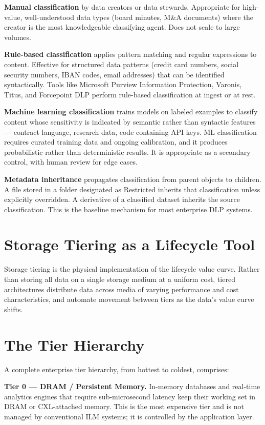 \textbf{Manual classification} by data creators or data stewards. Appropriate for high-value, well-understood data types (board minutes, M\&A documents) where the creator is the most knowledgeable classifying agent. Does not scale to large volumes.

\textbf{Rule-based classification} applies pattern matching and regular expressions to content. Effective for structured data patterns (credit card numbers, social security numbers, IBAN codes, email addresses) that can be identified syntactically. Tools like Microsoft Purview Information Protection, Varonis, Titus, and Forcepoint DLP perform rule-based classification at ingest or at rest.

\textbf{Machine learning classification} trains models on labeled examples to classify content whose sensitivity is indicated by semantic rather than syntactic features --- contract language, research data, code containing API keys. ML classification requires curated training data and ongoing calibration, and it produces probabilistic rather than deterministic results. It is appropriate as a secondary control, with human review for edge cases.

\textbf{Metadata inheritance} propagates classification from parent objects to children. A file stored in a folder designated as Restricted inherits that classification unless explicitly overridden. A derivative of a classified dataset inherits the source classification. This is the baseline mechanism for most enterprise DLP systems.

\section{Storage Tiering as a Lifecycle Tool}
Storage tiering is the physical implementation of the lifecycle value curve. Rather than storing all data on a single storage medium at a uniform cost, tiered architectures distribute data across media of varying performance and cost characteristics, and automate movement between tiers as the data's value curve shifts.

\section{The Tier Hierarchy}
A complete enterprise tier hierarchy, from hottest to coldest, comprises:

\textbf{Tier 0 --- DRAM / Persistent Memory.} In-memory databases and real-time analytics engines that require sub-microsecond latency keep their working set in DRAM or CXL-attached memory. This is the most expensive tier and is not managed by conventional ILM systems; it is controlled by the application layer.

